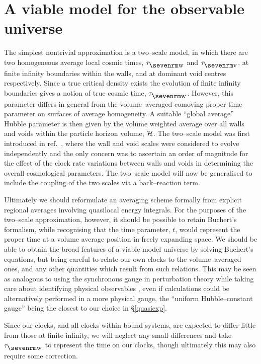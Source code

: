 \documentclass[12pt]{article}
\begin{document}
\section{A viable model for the observable universe\label{Have}}

The simplest nontrivial approximation is a two--scale model, in which
there are two homogeneous average local cosmic times, $\tw$ and $\tv$,
at finite infinity boundaries within the walls, and at dominant void
centres respectively. Since a true critical density exists the evolution
of finite infinity boundaries gives a notion of true cosmic time, $\tw$.
However, this parameter differs in general from the volume--averaged comoving
proper time parameter on surfaces of average homogeneity. A suitable
``global average'' Hubble parameter is then given by the volume weighted
average over all walls and voids within the particle horizon volume, $\cal
H$. The two--scale model was first introduced in ref.\ \cite{paper0},
where the wall and void scales were considered to evolve independently
and the only concern was to ascertain an order of magnitude for the
effect of the clock rate variations between walls and voids in determining
the overall cosmological parameters. The two--scale model will now
be generalised to include the coupling of the two scales via a
back--reaction term.

Ultimately we should reformulate an averaging scheme formally from explicit
regional averages involving quasilocal energy integrals. For the purposes of
the two--scale approximation, however, it should be possible to retain
Buchert's formalism, while recognising that the time parameter, $t$, would
represent the proper time at a volume average position in freely expanding
space. We should be able to obtain the broad features of a viable model
universe by solving Buchert's equations, but being careful to relate our
own clocks to the volume--averaged ones, and any other quantities which
result from such relations. This may be seen as analogous to using the
synchronous gauge in perturbation theory while taking care about identifying
physical observables \cite{PV}, even if calculations could be alternatively
performed in a more physical gauge, the ``uniform Hubble--constant gauge''
\cite{Bard} being the closest to our choice in \S\ref{quasiexp}.

Since our clocks, and all clocks within bound systems, are
expected to differ little from those at finite infinity, we will neglect
any small differences and take $\tw$ to represent the time on our clocks,
though ultimately this may also require some correction.
\end{document}
